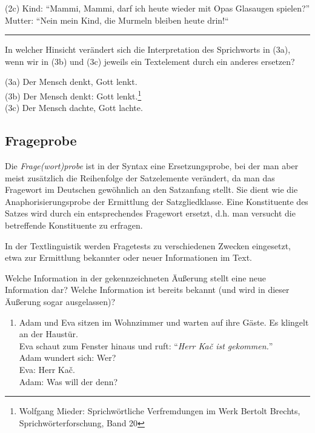 \documentclass[
  letterpaper,
  DIV=11,
  numbers=noendperiod]{scrreprt}
\providecommand{\tightlist}{%
  \setlength{\itemsep}{0pt}\setlength{\parskip}{0pt}}\usepackage{longtable,booktabs,array}
\begin{document}
(2c) Kind: ``Mammi, Mammi, darf ich heute wieder mit Opas Glasaugen
spielen?''\\
Mutter: ``Nein mein Kind, die Murmeln bleiben heute drin!{}``\\

\begin{center}\rule{0.5\linewidth}{0.5pt}\end{center}

In welcher Hinsicht verändert sich die Interpretation des Sprichworts in
(3a), wenn wir in (3b) und (3c) jeweils ein Textelement durch ein
anderes ersetzen?

(3a) Der Mensch denkt, Gott lenkt.\\
(3b) Der Mensch denkt: Gott lenkt.\footnote{Wolfgang Mieder:
  Sprichwörtliche Verfremdungen im Werk Bertolt Brechts,
  Sprichwörterforschung, Band 20}\\
(3c) Der Mensch dachte, Gott lachte.\\

\hypertarget{frageprobe}{%
\subsection{Frageprobe}\label{frageprobe}}

Die \emph{Frage(wort)probe} ist in der Syntax eine Ersetzungsprobe, bei
der man aber meist zusätzlich die Reihenfolge der Satzelemente
verändert, da man das Fragewort im Deutschen gewöhnlich an den
Satzanfang stellt. Sie dient wie die Anaphorisierungsprobe der
Ermittlung der Satzgliedklasse. Eine Konstituente des Satzes wird durch
ein entsprechendes Fragewort ersetzt, d.h. man versucht die betreffende
Konstituente zu erfragen.

In der Textlinguistik werden Fragetests zu verschiedenen Zwecken
eingesetzt, etwa zur Ermittlung bekannter oder neuer Informationen im
Text.

Welche Information in der gekennzeichneten Äußerung stellt eine neue
Information dar? Welche Information ist bereits bekannt (und wird in
dieser Äußerung sogar ausgelassen)?\\

\begin{enumerate}
\def\labelenumi{(\arabic{enumi})}
\setcounter{enumi}{3}
\tightlist
\item
  Adam und Eva sitzen im Wohnzimmer und warten auf ihre Gäste. Es
  klingelt an der Haustür.\\
  Eva schaut zum Fenster hinaus und ruft: ``\emph{Herr Kač ist
  gekommen.}''\\
  Adam wundert sich: Wer?\\
  Eva: Herr Kač.\\
  Adam: Was will der denn?\\
\end{enumerate}
\end{document}
